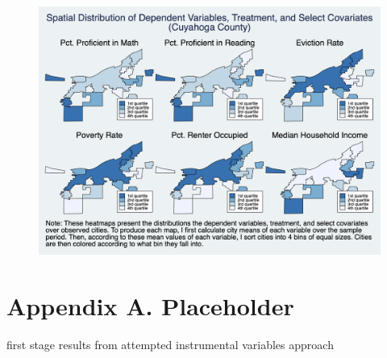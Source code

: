\documentclass[12pt]{article}
\begin{document}
\begin{landscape}
\begin{figure}
    \centering
    \includegraphics[scale=0.6]{output/graphs/maps.png}
    \caption{}
    \label{fig:my_label}
\end{figure}
\end{landscape}


\section*{Appendix A. Placeholder} \label{sec:appendixa}
first stage results from attempted instrumental variables approach
\end{document}

